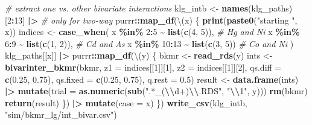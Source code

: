 \documentclass[12pt, twoside]{amherstthesis}
\newenvironment{Shaded}{\begin{snugshade}}{\end{snugshade}}
\newcommand{\AttributeTok}[1]{\textcolor[rgb]{0.13,0.29,0.53}{#1}}
\newcommand{\CommentTok}[1]{\textcolor[rgb]{0.56,0.35,0.01}{\textit{#1}}}
\newcommand{\DecValTok}[1]{\textcolor[rgb]{0.00,0.00,0.81}{#1}}
\newcommand{\FloatTok}[1]{\textcolor[rgb]{0.00,0.00,0.81}{#1}}
\newcommand{\FunctionTok}[1]{\textcolor[rgb]{0.13,0.29,0.53}{\textbf{#1}}}
\newcommand{\NormalTok}[1]{#1}
\newcommand{\OtherTok}[1]{\textcolor[rgb]{0.56,0.35,0.01}{#1}}
\newcommand{\SpecialCharTok}[1]{\textcolor[rgb]{0.81,0.36,0.00}{\textbf{#1}}}
\newcommand{\StringTok}[1]{\textcolor[rgb]{0.31,0.60,0.02}{#1}}
\begin{document}
\begin{Shaded}
\begin{Highlighting}[]
\CommentTok{\# extract one vs. other bivariate interactions}
\NormalTok{klg\_intb }\OtherTok{\textless{}{-}} \FunctionTok{names}\NormalTok{(klg\_paths)[}\DecValTok{2}\SpecialCharTok{:}\DecValTok{13}\NormalTok{] }\SpecialCharTok{|\textgreater{}} \CommentTok{\# only for two{-}way}
\NormalTok{  purrr}\SpecialCharTok{::}\FunctionTok{map\_df}\NormalTok{(\textbackslash{}(x) \{}
    \FunctionTok{print}\NormalTok{(}\FunctionTok{paste0}\NormalTok{(}\StringTok{"starting "}\NormalTok{, x))}
\NormalTok{    indices }\OtherTok{\textless{}{-}} \FunctionTok{case\_when}\NormalTok{(}
\NormalTok{      x }\SpecialCharTok{\%in\%} \DecValTok{2}\SpecialCharTok{:}\DecValTok{5} \SpecialCharTok{\textasciitilde{}} \FunctionTok{list}\NormalTok{(}\FunctionTok{c}\NormalTok{(}\DecValTok{4}\NormalTok{, }\DecValTok{5}\NormalTok{)), }\CommentTok{\# Hg and Ni}
\NormalTok{      x }\SpecialCharTok{\%in\%} \DecValTok{6}\SpecialCharTok{:}\DecValTok{9} \SpecialCharTok{\textasciitilde{}} \FunctionTok{list}\NormalTok{(}\FunctionTok{c}\NormalTok{(}\DecValTok{1}\NormalTok{, }\DecValTok{2}\NormalTok{)), }\CommentTok{\# Cd and As}
\NormalTok{      x }\SpecialCharTok{\%in\%} \DecValTok{10}\SpecialCharTok{:}\DecValTok{13} \SpecialCharTok{\textasciitilde{}} \FunctionTok{list}\NormalTok{(}\FunctionTok{c}\NormalTok{(}\DecValTok{3}\NormalTok{, }\DecValTok{5}\NormalTok{)) }\CommentTok{\# Co and Ni}
\NormalTok{    )}
\NormalTok{    klg\_paths[[x]] }\SpecialCharTok{|\textgreater{}} 
\NormalTok{      purrr}\SpecialCharTok{::}\FunctionTok{map\_df}\NormalTok{(\textbackslash{}(y) \{}
\NormalTok{        bkmr }\OtherTok{\textless{}{-}} \FunctionTok{read\_rds}\NormalTok{(y)}
\NormalTok{        ints }\OtherTok{\textless{}{-}} \FunctionTok{bivarinter\_bkmr}\NormalTok{(bkmr, }
                                \AttributeTok{z1 =}\NormalTok{ indices[[}\DecValTok{1}\NormalTok{]][}\DecValTok{1}\NormalTok{], }
                                \AttributeTok{z2 =}\NormalTok{ indices[[}\DecValTok{1}\NormalTok{]][}\DecValTok{2}\NormalTok{], }
                                \AttributeTok{qs.diff =} \FunctionTok{c}\NormalTok{(}\FloatTok{0.25}\NormalTok{, }\FloatTok{0.75}\NormalTok{), }
                                \AttributeTok{qs.fixed =} \FunctionTok{c}\NormalTok{(}\FloatTok{0.25}\NormalTok{, }\FloatTok{0.75}\NormalTok{),}
                                \AttributeTok{q.rest =} \FloatTok{0.5}\NormalTok{)}
\NormalTok{        result }\OtherTok{\textless{}{-}} \FunctionTok{data.frame}\NormalTok{(ints) }\SpecialCharTok{|\textgreater{}} 
          \FunctionTok{mutate}\NormalTok{(}\AttributeTok{trial =} \FunctionTok{as.numeric}\NormalTok{(}\FunctionTok{sub}\NormalTok{(}\StringTok{".*\_(}\SpecialCharTok{\textbackslash{}\textbackslash{}}\StringTok{d+)}\SpecialCharTok{\textbackslash{}\textbackslash{}}\StringTok{.RDS"}\NormalTok{, }\StringTok{"}\SpecialCharTok{\textbackslash{}\textbackslash{}}\StringTok{1"}\NormalTok{, y)))}
        \FunctionTok{rm}\NormalTok{(bkmr)}
        \FunctionTok{return}\NormalTok{(result)}
\NormalTok{      \}) }\SpecialCharTok{|\textgreater{}} 
      \FunctionTok{mutate}\NormalTok{(}\AttributeTok{case =}\NormalTok{ x)}
\NormalTok{  \})}
\FunctionTok{write\_csv}\NormalTok{(klg\_intb, }\StringTok{"sim/bkmr\_lg/int\_bivar.csv"}\NormalTok{)}


\end{Highlighting}
\end{Shaded}
\end{document}

